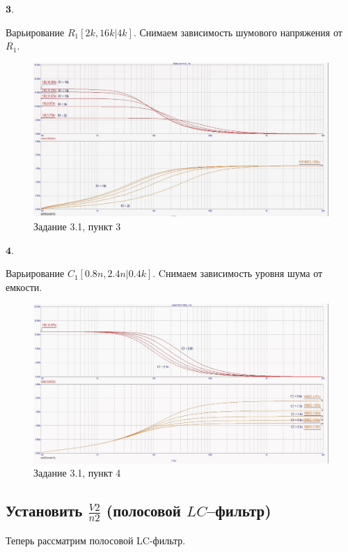 \documentclass[a4paper, 14pt]{extarticle}%
\begin{document}
$\textbf{3.}$


Варьирование $R_1[2k, 16k | 4k]$.
Снимаем зависимость шумового напряжения от $R_1$.

\begin{figure}[h!]
			\centering
			\includegraphics[width=1.1\linewidth]{3/3_1_4.jpg}
			\caption{Задание 3.1, пункт 3}
			\label{A}
\end{figure}


$\textbf{4.}$


Варьирование $C_1[0.8n, 2.4n | 0.4k]$.
Cнимаем зависимость уровня шума от емкости.

\begin{figure}[h!]
			\centering
			\includegraphics[width=1.1\linewidth]{3/3_1_3.jpg}
			\caption{Задание 3.1, пункт 4}
			\label{A}
\end{figure}

\subsection{Установить $\frac{V2}{n2}$ (полосовой $LC$--фильтр)}

Теперь рассматрим полосовой LC-фильтр.
\end{document}
